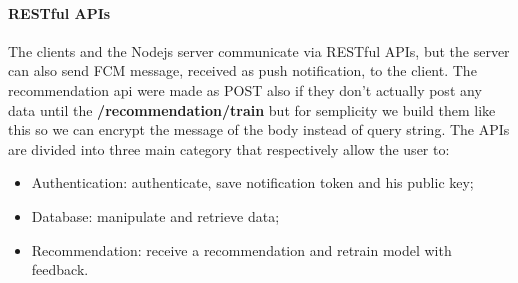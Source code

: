\documentclass[../../main]{subfiles}
\begin{document}
\paragraph{RESTful APIs}
The clients and the Nodejs server communicate via RESTful APIs, but the server can also send FCM message, received as push notification, to the client.
The recommendation api were made as POST also if they don't actually post any data until the \textbf{/recommendation/train} but for semplicity we build
them like this so we can encrypt the message of the body instead of query string.
The APIs are divided into three main category that respectively allow the user to:
\begin{itemize}
    \item Authentication: authenticate, save notification token and his public key;
    \item Database: manipulate and retrieve data;
    \item Recommendation: receive a recommendation and retrain model with feedback.
\end{itemize}
\end{document}
